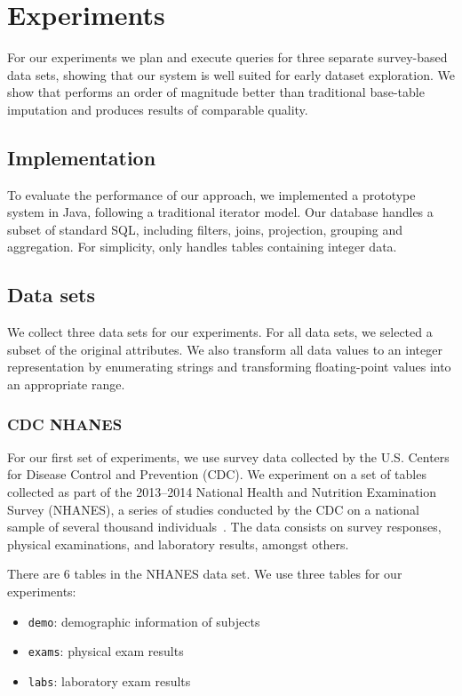 \section{Experiments}\label{sec:experiments}
For our experiments we plan and execute queries for three separate survey-based data sets, showing that our system is well suited for early dataset exploration.
We show that \ProjectName{} performs an order of magnitude better than traditional
base-table imputation and produces results of comparable quality.

\subsection{Implementation}
To evaluate the performance of our approach, we implemented a prototype system in Java, following a traditional iterator model.
Our database handles a subset of standard SQL, including filters, joins, projection, grouping and aggregation.
For simplicity, \ProjectName{} only handles tables containing integer data.

\subsection{Data sets}\label{subsec:datasets}
We collect three data sets for our experiments.
For all data sets, we selected a subset of the original attributes.
We also transform all data values to an integer representation by enumerating strings and transforming floating-point values into an appropriate range.

\subsubsection{CDC NHANES}
For our first set of experiments, we use survey data collected by the 
U.S. Centers for Disease Control and Prevention (CDC). We
experiment on a set of tables collected as part of the 2013--2014 National
Health and Nutrition Examination Survey (NHANES), a series of studies
conducted by the CDC on a national sample of several thousand individuals~\cite{cdc-data}.
The data consists on survey responses, physical examinations, and laboratory
results, amongst others.

There are 6 tables in the NHANES data set. We use three tables for our experiments:

\begin{itemize}
	\item \texttt{demo}: demographic information of subjects
	\item \texttt{exams}: physical exam results
	\item \texttt{labs}: laboratory exam results
\end{itemize}

